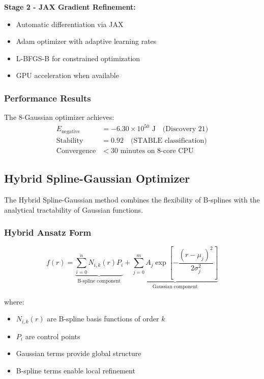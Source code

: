 \documentclass[12pt]{article}
\begin{document}
\textbf{Stage 2 - JAX Gradient Refinement:}
\begin{itemize}
\item Automatic differentiation via JAX
\item Adam optimizer with adaptive learning rates
\item L-BFGS-B for constrained optimization
\item GPU acceleration when available
\end{itemize}

\subsubsection{Performance Results}

The 8-Gaussian optimizer achieves:
\begin{align}
E_{\text{negative}} &= -6.30 \times 10^{50} \text{ J} \quad \text{(Discovery 21)} \\
\text{Stability} &= 0.92 \quad \text{(STABLE classification)} \\
\text{Convergence} &< 30 \text{ minutes on 8-core CPU}
\end{align}

\subsection{Hybrid Spline-Gaussian Optimizer}

The Hybrid Spline-Gaussian method combines the flexibility of B-splines with the analytical tractability of Gaussian functions.

\subsubsection{Hybrid Ansatz Form}

\[
f(r) = \underbrace{\sum_{i=0}^{n} N_{i,k}(r) P_i}_{\text{B-spline component}} + \underbrace{\sum_{j=0}^{m} A_j \exp\left[-\frac{(r-\mu_j)^2}{2\sigma_j^2}\right]}_{\text{Gaussian component}}
\]

where:
\begin{itemize}
\item $N_{i,k}(r)$ are B-spline basis functions of order $k$
\item $P_i$ are control points
\item Gaussian terms provide global structure
\item B-spline terms enable local refinement
\end{itemize}
\end{document}
